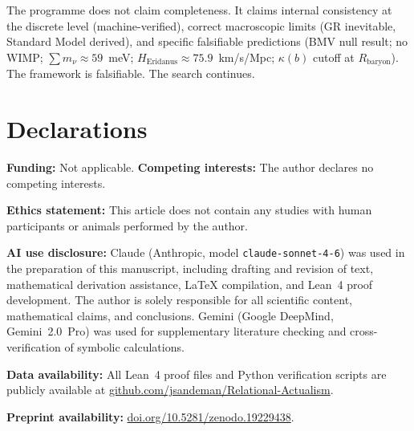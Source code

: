 \documentclass[11pt,a4paper]{article}
\begin{document}
The programme does not claim completeness. It claims internal consistency
at the discrete level (machine-verified), correct macroscopic limits
(GR inevitable, Standard Model derived), and specific falsifiable
predictions (BMV null result; no WIMP; $\sum m_\nu \approx 59$~meV;
$H_{\mathrm{Eridanus}} \approx 75.9$~km/s/Mpc; $\kappa(b)$ cutoff at
$R_{\mathrm{baryon}}$). The framework is falsifiable. The search continues.


\section*{Declarations}
\textbf{Funding:} Not applicable.\quad
\textbf{Competing interests:} The author declares no competing interests.

\textbf{Ethics statement:} This article does not contain any studies with human participants or animals performed by the author.

\textbf{AI use disclosure:} Claude (Anthropic, model \texttt{claude-sonnet-4-6}) was used in the preparation of this manuscript, including drafting and revision of text, mathematical derivation assistance, \LaTeX{} compilation, and Lean~4 proof development. The author is solely responsible for all scientific content, mathematical claims, and conclusions. Gemini (Google DeepMind, Gemini~2.0~Pro) was used for supplementary literature checking and cross-verification of symbolic calculations.

\textbf{Data availability:} All Lean~4 proof files and Python verification scripts are publicly available at \href{https://github.com/jsandeman/Relational-Actualism}{github.com/jsandeman/Relational-Actualism}.

\textbf{Preprint availability:} \href{https://doi.org/10.5281/zenodo.19229438}{doi.org/10.5281/zenodo.19229438}.


\end{document}
